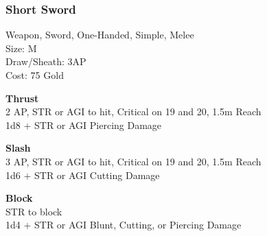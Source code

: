 \subsubsection{Short Sword}\label{weapon:shortSword}
Weapon, Sword, One-Handed, Simple, Melee\\
Size: M\\
Draw/Sheath: 3AP\\
Cost: 75 Gold

\textbf{Thrust}\\
2 AP, STR or AGI to hit, Critical on 19 and 20, 1.5m Reach\\
1d8 + \texttimes STR or AGI Piercing Damage

\textbf{Slash}\\
3 AP, STR or AGI to hit, Critical on 19 and 20, 1.5m Reach\\
1d6 + \texttimes STR or AGI Cutting Damage

\textbf{Block}\\
STR to block\\
1d4 + \texttimes STR or AGI Blunt, Cutting, or Piercing Damage

